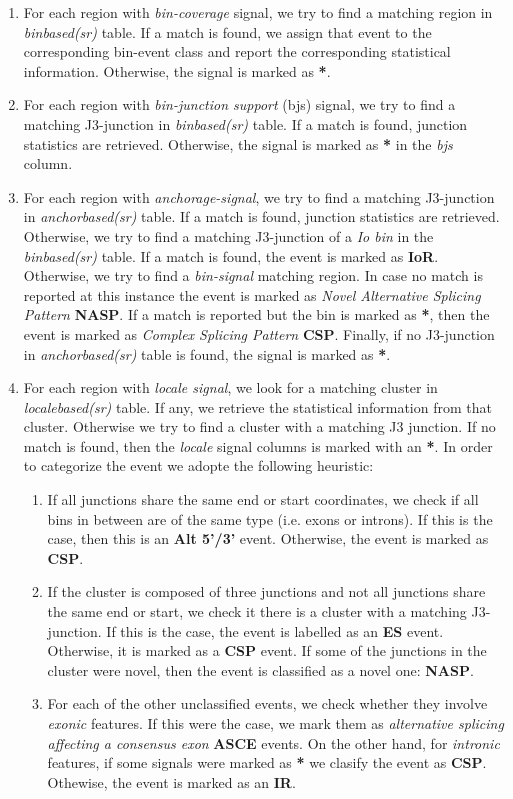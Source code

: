 \documentclass{article}
\begin{document}
\begin{enumerate}
\item For each region with {\em bin-coverage} signal, we try to find a matching region in {\em binbased(sr)} table. If a match is found, we assign that event to the corresponding bin-event class and report the corresponding statistical information. Otherwise, the signal is marked as \textbf{*}.
\item For each region with {\em bin-junction support} (bjs) signal, we try to find a matching J3-junction in {\em binbased(sr)} table. If a match is found, junction statistics are retrieved. Otherwise, the signal is marked as \textbf{*} in the {\em bjs} column. 
\item For each region with {\em anchorage-signal}, we try to find a matching J3-junction in {\em anchorbased(sr)} table. If a match is found, junction statistics are retrieved. Otherwise, we try to find a matching J3-junction of a {\em Io bin} in the {\em binbased(sr)} table. If a match is found, the event is marked as \textbf{IoR}. Otherwise, we try to find a {\em bin-signal} matching region. In case no match is reported at this instance the event is marked as {\em Novel Alternative Splicing Pattern} \textbf{NASP}. If a match is reported but the bin is marked as \textbf{*}, then the event is marked as {\em Complex Splicing Pattern} \textbf{CSP}. Finally, if no J3-junction in {\em anchorbased(sr)} table is found, the signal is marked as \textbf{*}. 
\item For each region with {\em locale signal}, we look for a matching cluster  in {\em localebased(sr)} table. If any, we retrieve the statistical information from that cluster. Otherwise we try to find a cluster with a matching J3 junction. If no match is found, then the {\em locale} signal columns is marked with an \textbf{*}. In order to categorize the event we adopte the following heuristic: 
\begin{enumerate}
\item If all junctions share the same end or start coordinates, we check if all bins in between are of the same type (i.e. exons or introns). If this is the case, then this is an \textbf{Alt 5'/3'} event. Otherwise, the event is marked as \textbf{CSP}. 
\item If the cluster is composed of three junctions and not all junctions share the same end or start, we check it there is a cluster with a matching J3-junction. If this is the case, the event is labelled as an \textbf{ES} event. Otherwise, it is marked as a \textbf{CSP} event. If some of the junctions in the cluster were novel, then the event is classified as a novel one: \textbf{NASP}. 
\item For each of the other unclassified events, we check whether they involve {\em exonic} features. If this were the case, we mark them as {\em alternative splicing affecting a consensus exon} \textbf{ASCE} events. On the other hand, for {\em intronic} features, if some signals were marked as \textbf{*} we clasify the event as \textbf{CSP}. Othewise, the event is marked as an \textbf{IR}.
\end{enumerate}
\end{enumerate}
\end{document}

